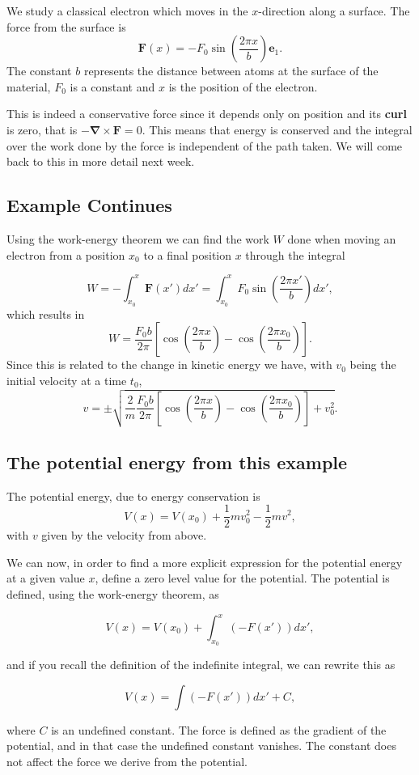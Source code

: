 \documentclass[%
oneside,                 %
final,                   %
10pt]{article}
\begin{document}
We study a classical electron which moves in the $x$-direction along a surface. The force from the surface is
\[
\bm{F}(x)=-F_0\sin{(\frac{2\pi x}{b})}\bm{e}_1.
\]
The constant $b$ represents the distance between atoms at the surface of the material, $F_0$ is a constant and $x$ is the position of the electron.

This is indeed a conservative force since it depends only on position
and its \textbf{curl} is zero, that is $-\bm{\nabla}\times \bm{F}=0$. This means that energy is conserved and the
integral over the work done by the force is independent of the path
taken. We will come back to this in more detail next week.

\subsection{Example Continues}

Using the work-energy theorem we can find the work $W$ done when
moving an electron from a position $x_0$ to a final position $x$
through the integral

\[
W=-\int_{x_0}^x \bm{F}(x')dx' =  \int_{x_0}^x F_0\sin{(\frac{2\pi x'}{b})} dx',
\]
which results in
\[
W=\frac{F_0b}{2\pi}\left[\cos{(\frac{2\pi x}{b})}-\cos{(\frac{2\pi x_0}{b})}\right].
\]
Since this is related to the change in kinetic energy we have, with $v_0$ being the initial velocity at a  time $t_0$,
\[
v  = \pm\sqrt{\frac{2}{m}\frac{F_0b}{2\pi}\left[\cos{(\frac{2\pi x}{b})}-\cos{(\frac{2\pi x_0}{b})}\right]+v_0^2}.
\]

\subsection{The potential energy from this example}

The potential energy, due to energy conservation is
\[
V(x)=V(x_0)+\frac{1}{2}mv_0^2-\frac{1}{2}mv^2,
\]
with $v$ given by the velocity from above.

We can now, in order to find a more explicit expression for the
potential energy at a given value $x$, define a zero level value for
the potential. The potential is defined, using the work-energy
theorem, as

\[
V(x)=V(x_0)+\int_{x_0}^x (-F(x'))dx',
\]

and if you recall the definition of the indefinite integral, we can rewrite this as

\[
V(x)=\int (-F(x'))dx'+C,
\]

where $C$ is an undefined constant. The force is defined as the
gradient of the potential, and in that case the undefined constant
vanishes. The constant does not affect the force we derive from the
potential.
\end{document}
